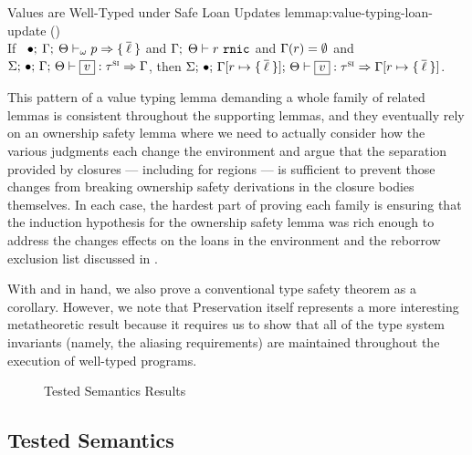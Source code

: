 \begin{oxlemma}{Values are Well-Typed under Safe Loan Updates}
  {lemmap:value-typing-loan-update}
  () \hfill \\
  If \ $\bullet; \: \Gamma; \: \Theta \vdash_{\omega} p \Rightarrow 
    \{ \: \overline{\ell} \: \} $ and
  $\Gamma; \; \Theta \vdash r \ \mathtt{rnic}$ and
  $\Gamma(r) = \emptyset$ and
  $\oxtypjudge{\oxglobalctx}{\oxemptyctx}{\oxkontctx}{\oxvarctx}
  {\oxvalue}{\oxsitype}{\oxvarctx}$, then
  $\oxtypjudge{\oxglobalctx}{\oxemptyctx}{\oxkontctx}{ \oxupdate{\oxvarctx}{
      \oxloanctxentry{\oxcprov}{ \oxset{\overline{\oxloan}} } }
  }{\oxvalue}{\oxsitype}{ \oxupdate{\oxvarctx}{ \oxloanctxentry{\oxcprov}{
        \oxset{\overline{\oxloan}} } } }$.
\end{oxlemma}

This pattern of a value typing lemma demanding a whole family of related lemmas
is consistent throughout the supporting lemmas, and they eventually rely on an
ownership safety lemma where we need to actually consider how the various
judgments each change the environment and argue that the separation provided by
closures --- including for regions --- is sufficient to prevent those changes
from breaking ownership safety derivations in the closure bodies themselves. In
each case, the hardest part of proving each family is ensuring that the
induction hypothesis for the ownership safety lemma was rich enough to address
the changes effects on the loans in the environment and the reborrow exclusion
list discussed in .

With  and  in hand, we also
prove a conventional type safety theorem as a corollary. However, we note that
Preservation itself represents a more interesting metatheoretic result because
it requires us to show that all of the type system invariants (namely, the
aliasing requirements) are maintained throughout the execution of well-typed
programs.

\begin{figure}
  \figuresize
  

  \vspace{-1em}
  \caption{Tested Semantics Results}
  \label{fig:test-results}
  \vspace{-1em}
\end{figure}

\subsection{Tested Semantics}
\label{sec:tested-semantics}

